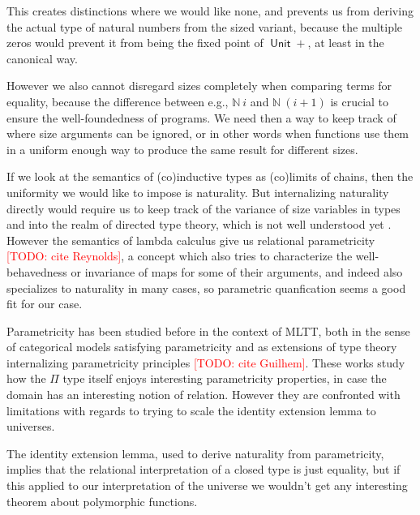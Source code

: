 \documentclass{book}
\newcommand{\TODO}[1]{\textcolor{red}{[TODO: #1]}}
\DeclareMathOperator{\Unit}{\mathsf{Unit}}
\newcommand{\U}{\mathsf{U}}
\newcommand{\sd}{.\,}
\newcommand{\sNat}{\mathbb{N}}
\begin{document}
This creates distinctions where we would like none, and prevents us
from deriving the actual type of natural numbers from the sized
variant, because the multiple zeros would prevent it from being the
fixed point of $\Unit +$, at least in the canonical way.

However we also cannot disregard sizes completely when comparing terms
for equality, because the difference between e.g., $\sNat~i$ and
$\sNat~(i+1)$ is crucial to ensure the well-foundedness of programs.
We need then a way to keep track of where size arguments can be
ignored, or in other words when functions use them in a uniform enough
way to produce the same result for different sizes.

If we look at the semantics of (co)inductive types as (co)limits of
chains, then the uniformity we would like to impose is naturality. But
internalizing naturality directly would require us to keep track of
the variance of size variables in types and into the realm of directed
type theory, which is not well understood yet \cite{Harper-Licata,
  Shulman}. However the semantics of lambda calculus give us
relational parametricity \TODO{cite Reynolds}, a concept which also
tries to characterize the well-behavedness or invariance of maps for
some of their arguments, and indeed also specializes to naturality in
many cases, so parametric quanfication seems a good fit for our
case.


Parametricity has been studied before in the context of MLTT,
both in the sense of categorical models satisfying parametricity
 and as extensions of type theory
internalizing parametricity principles \TODO{cite Guilhem}.
These works study how the $\Pi$ type itself enjoys interesting
parametricity properties, in case the domain has an interesting notion
of relation. However they are confronted with limitations with regards
to trying to scale the identity extension lemma to universes.

The identity extension lemma, used to derive naturality from
parametricity, implies that the relational interpretation of a
closed type is just equality, but if  this applied to our
interpretation of the universe we wouldn't get any interesting theorem
about polymorphic functions.%

\end{document}
